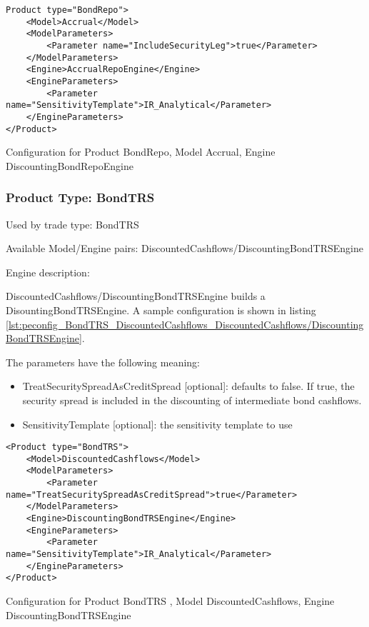 \begin{longlisting}
\begin{verbatim}
Product type="BondRepo">
    <Model>Accrual</Model>
    <ModelParameters>
        <Parameter name="IncludeSecurityLeg">true</Parameter>
    </ModelParameters>
    <Engine>AccrualRepoEngine</Engine>
    <EngineParameters>
        <Parameter name="SensitivityTemplate">IR_Analytical</Parameter>
    </EngineParameters>
</Product>
\end{verbatim}
\caption{Configuration for Product BondRepo, Model Accrual, Engine DiscountingBondRepoEngine}
\label{lst:peconfig_BondRepo_Accrual_AccrualBondRepoEngine}
\end{longlisting}

\subsubsection{Product Type: BondTRS}

Used by trade type: BondTRS

Available Model/Engine pairs: DiscountedCashflows/DiscountingBondTRSEngine

Engine description:

DiscountedCashflows/DiscountingBondTRSEngine builds a DisountingBondTRSEngine. A sample configuration is shown in listing \ref{lst:peconfig_BondTRS_DiscountedCashflows_DiscountedCashflows/DiscountingBondTRSEngine}.

The parameters have the following meaning:

\begin{itemize}
\item TreatSecuritySpreadAsCreditSpread [optional]: defaults to false. If true, the security spread is included in the
  discounting of intermediate bond cashflows.
\item SensitivityTemplate [optional]: the sensitivity template to use 
\end{itemize}

\begin{longlisting}
\begin{verbatim}
<Product type="BondTRS">
    <Model>DiscountedCashflows</Model>
    <ModelParameters>
        <Parameter name="TreatSecuritySpreadAsCreditSpread">true</Parameter>
    </ModelParameters>
    <Engine>DiscountingBondTRSEngine</Engine>
    <EngineParameters>
        <Parameter name="SensitivityTemplate">IR_Analytical</Parameter>
    </EngineParameters>
</Product>
\end{verbatim}
\caption{Configuration for Product BondTRS , Model DiscountedCashflows, Engine DiscountingBondTRSEngine}
\label{lst:peconfig_BondTRS_DiscountedCashflows_DiscountedCashflows/DiscountingBondTRSEngine}
\end{longlisting}

